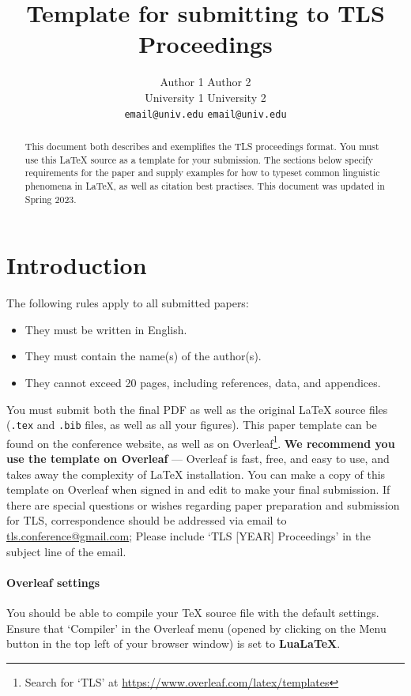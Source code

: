 \documentclass[11pt]{article}
\title{\liningfont Template for submitting to TLS Proceedings}
\author{\liningfont Author 1 \quad Author 2 \\ University 1 \quad University 2 \\ \texttt{email@univ.edu} \quad \texttt{email@univ.edu}}
\date{}           %
\begin{document}
\maketitle
\thispagestyle{empty}
\pagestyle{empty}


\begin{abstract}
\noindent This document both describes and exemplifies the TLS proceedings format. You must use this \LaTeX{}  source as a template for your submission. The sections below specify requirements for the paper and supply examples for how to typeset common linguistic phenomena in \LaTeX{}, as well as citation best practises. This document was updated in Spring 2023.
\end{abstract}

\section{Introduction}

The following rules apply to all submitted papers:

\begin{itemize}
    \item They must be written in English.
    \item They must contain the name(s) of the author(s).
    \item They cannot exceed 20 pages, including references, data, and appendices.
\end{itemize}

You must submit both the final PDF as well as the original \LaTeX{} source files (\texttt{.tex} and \texttt{.bib} files, as well as all your figures). This paper template can be found on the conference website, as well as on Overleaf\footnote{Search for `TLS' at \url{https://www.overleaf.com/latex/templates}}. \textbf{We recommend you use the template on Overleaf} --- Overleaf is fast, free, and easy to use, and takes away the complexity of LaTeX installation. You can make a copy of this template on Overleaf when signed in and edit to make your final submission. If there are special questions or wishes regarding paper preparation and submission for TLS, correspondence should be addressed via email to \url{tls.conference@gmail.com}; Please include `TLS [YEAR] Proceedings' in the subject line of the email.

\paragraph{Overleaf settings} You should be able to compile your \TeX{} source file with the default settings. Ensure that `Compiler' in the Overleaf menu (opened by clicking on the Menu button in the top left of your browser window) is set to \textbf{LuaLaTeX}.
\end{document}
